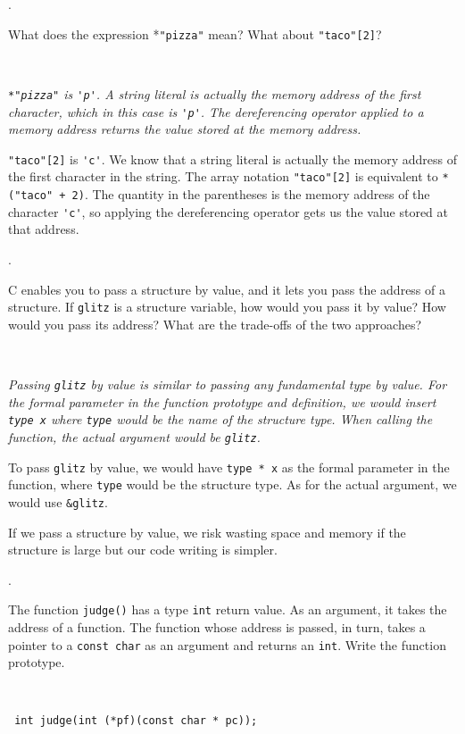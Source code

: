 \documentclass{amsart}
\begin{document}
. 
\begin{minipage}[t]{11.5 cm}
	What does the expression *\verb+"pizza"+ mean? What about \verb+"taco"[2]+?
\end{minipage} \\[1ex]
\phantom{2. } 
\begin{minipage}[t]{11.5 cm}
	{\slshape \quad \verb+*"pizza"+ is \verb+'p'+. A string literal is actually the memory address of the first character, which in this case is \verb+'p'+. The dereferencing operator applied to a memory address returns the value stored at the memory address.

	\quad \verb+"taco"[2]+ is \verb+'c'+. We know that a string literal is actually the memory address of the first character in the string. The array notation \verb+"taco"[2]+ is equivalent to \verb&*("taco" + 2)&. The quantity in the parentheses is the memory address of the character \verb+'c'+, so applying the dereferencing operator gets us the value stored at that address. } 
\end{minipage} 
\vfill

. 
\begin{minipage}[t]{11.5 cm}
	C\raisebox{.15ex}{++} enables you to pass a structure by value, and it lets you pass the address of a structure. If \texttt{glitz} is a structure variable, how would you pass it by value? How would you pass its address? What are the trade-offs of the two approaches?
\end{minipage} \\[1ex]
\phantom{3. } 
\begin{minipage}[t]{11.5 cm}
	{\slshape \quad Passing \verb+glitz+ by value is similar to passing any fundamental type by value. For the formal parameter in the function prototype and definition, we would insert \verb+type x+ where \verb+type+ would be the name of the structure type. When calling the function, the actual argument would be \verb+glitz+.

	\quad To pass \verb+glitz+ by value, we would have \verb+type * x+ as the formal parameter in the function, where \verb+type+ would be the structure type. As for the actual argument, we would use \verb+&glitz+.

	\quad If we pass a structure by value, we risk wasting space and memory if the structure is large but our code writing is simpler.} 
\end{minipage} 
\vfill

. 
\begin{minipage}[t]{11.5 cm}
	The function \texttt{judge()} has a type \texttt{int} return value. As an argument, it takes the address of a function. The function whose address is passed, in turn, takes a pointer to a \texttt{const char} as an argument and returns an \texttt{int}. Write the function prototype. 
\end{minipage} \\[1ex]
\phantom{3. } 
\begin{minipage}[t]{11.5 cm}
	\verb+ int judge(int (*pf)(const char * pc));+
\end{minipage} 
\vfill
\end{document}
